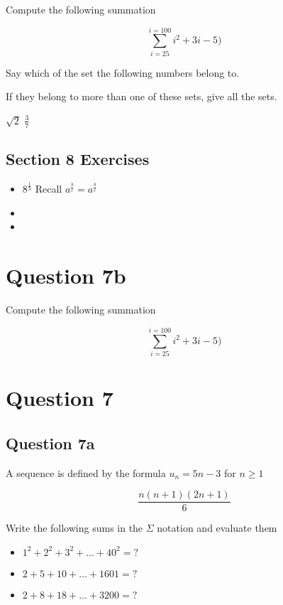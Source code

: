 \documentclass[]{report}
\begin{document}
	Compute the following summation
	
	\[ \sum^{i=100}_{i=25} i^2 + 3i -5)\]
	
	
	Say which of the set the following numbers belong to.
	
	If they belong to more than one of these sets, give all the sets.
	
	$\sqrt{2}$
	$\frac{3}{7}$
	
	
	
	
	\subsection*{Section 8 Exercises}
	\begin{itemize}
		\item $8^{\frac{1}{3}}$ Recall $a^{\frac{b}{c}} = a^{\frac{b}{c}}$
		\item
		\item
	\end{itemize}
	
	
	
	
	
	\section*{Question 7b}
	
	Compute the following summation
	
	\[ \sum^{i=100}_{i=25} i^2 + 3i -5)\]
	
	
	
\section*{Question 7}
\subsection{Question 7a}

A sequence is defined by the formula 
$u_n = 5n-3$ for $n\geq 1$

\[\frac{n(n+1)(2n+1)}{6}\]

Write the following sums in the $\Sigma$ notation and evaluate them

\begin{itemize}
	\item $1^2 + 2^2 + 3^2 +  \ldots +  40^2 = ?$
	\item $2 + 5 + 10 + \ldots + 1601 = ?$
	\item $2+8+18+\ldots +3200 = ?$
\end{itemize}
\end{document}
